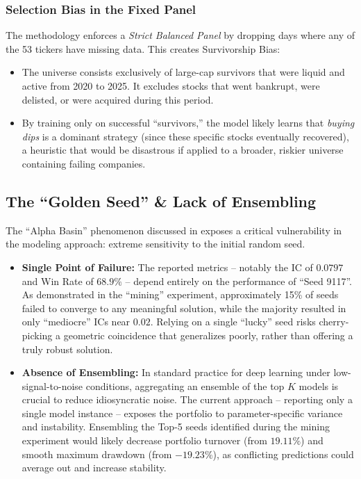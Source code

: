 \documentclass[twoside,final]{hcmut-report}
\newcommand{\result}[1]{\fcolorbox{red}{white}{#1}}
\begin{document}
\subsubsection{Selection Bias in the Fixed Panel}
The methodology enforces a \textit{Strict Balanced Panel} by dropping days where any of the 53 tickers have missing data. This creates Survivorship Bias:
\begin{itemize}
  \item The universe consists exclusively of large-cap survivors that were liquid and active from 2020 to 2025. It excludes stocks that went bankrupt, were delisted, or were acquired during this period.
  \item By training only on successful ``survivors,'' the model likely learns that \textit{buying dips} is a dominant strategy (since these specific stocks eventually recovered), a heuristic that would be disastrous if applied to a broader, riskier universe containing failing companies.
\end{itemize}

\subsection{The ``Golden Seed'' \& Lack of Ensembling}
The ``Alpha Basin'' phenomenon discussed in \result{Section~\ref{alpha_basin}} exposes a critical vulnerability in the modeling approach: extreme sensitivity to the initial random seed.

\begin{itemize}
  \item \textbf{Single Point of Failure:} The reported metrics -- notably the IC of $0.0797$ and Win Rate of $68.9\%$ -- depend entirely on the performance of ``Seed 9117''. As demonstrated in the ``mining'' experiment, approximately 15\% of seeds failed to converge to any meaningful solution, while the majority resulted in only ``mediocre'' ICs near $0.02$. Relying on a single ``lucky'' seed risks cherry-picking a geometric coincidence that generalizes poorly, rather than offering a truly robust solution.
  \item \textbf{Absence of Ensembling:} In standard practice for deep learning under low-signal-to-noise conditions, aggregating an ensemble of the top $K$ models is crucial to reduce idiosyncratic noise. The current approach -- reporting only a single model instance -- exposes the portfolio to parameter-specific variance and instability. Ensembling the Top-5 seeds identified during the mining experiment would likely decrease portfolio turnover (from $19.11\%$) and smooth maximum drawdown (from $-19.23\%$), as conflicting predictions could average out and increase stability.
\end{itemize}
\end{document}
